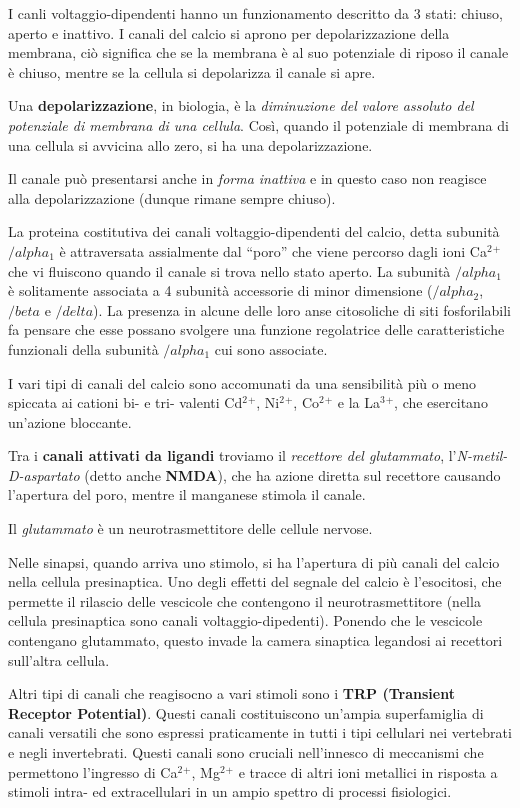 \documentclass[]{article}
\begin{document}
I canli voltaggio-dipendenti hanno un funzionamento descritto da 3
stati: chiuso, aperto e inattivo. I canali del calcio si aprono per
depolarizzazione della membrana, ciò significa che se la membrana è al
suo potenziale di riposo il canale è chiuso, mentre se la cellula si
depolarizza il canale si apre.

Una \textbf{depolarizzazione}, in biologia, è la \emph{diminuzione del
valore assoluto del potenziale di membrana di una cellula}. Così, quando
il potenziale di membrana di una cellula si avvicina allo zero, si ha
una depolarizzazione.

Il canale può presentarsi anche in \emph{forma inattiva} e in questo
caso non reagisce alla depolarizzazione (dunque rimane sempre chiuso).

La proteina costitutiva dei canali voltaggio-dipendenti del calcio,
detta subunità \(/alpha\)\(_1\) è attraversata assialmente dal ``poro''
che viene percorso dagli ioni Ca\(^2\)\(^+\) che vi fluiscono quando il
canale si trova nello stato aperto. La subunità \(/alpha\)\(_1\) è
solitamente associata a 4 subunità accessorie di minor dimensione
(\(/alpha\)\(_2\), \(/beta\) e \(/delta\)). La presenza in alcune delle
loro anse citosoliche di siti fosforilabili fa pensare che esse possano
svolgere una funzione regolatrice delle caratteristiche funzionali della
subunità \(/alpha\)\(_1\) cui sono associate.

I vari tipi di canali del calcio sono accomunati da una sensibilità più
o meno spiccata ai cationi bi- e tri- valenti Cd\(^2\)\(^+\),
Ni\(^2\)\(^+\), Co\(^2\)\(^+\) e la La\(^3\)\(^+\), che esercitano
un'azione bloccante.

Tra i \textbf{canali attivati da ligandi} troviamo il \emph{recettore
del glutammato}, l'\emph{N-metil-D-aspartato} (detto anche
\textbf{NMDA}), che ha azione diretta sul recettore causando l'apertura
del poro, mentre il manganese stimola il canale.

Il \emph{glutammato} è un neurotrasmettitore delle cellule nervose.

Nelle sinapsi, quando arriva uno stimolo, si ha l'apertura di più canali
del calcio nella cellula presinaptica. Uno degli effetti del segnale del
calcio è l'esocitosi, che permette il rilascio delle vescicole che
contengono il neurotrasmettitore (nella cellula presinaptica sono canali
voltaggio-dipedenti). Ponendo che le vescicole contengano glutammato,
questo invade la camera sinaptica legandosi ai recettori sull'altra
cellula.

Altri tipi di canali che reagisocno a vari stimoli sono i \textbf{TRP
(Transient Receptor Potential)}. Questi canali costituiscono un'ampia
superfamiglia di canali versatili che sono espressi praticamente in
tutti i tipi cellulari nei vertebrati e negli invertebrati. Questi
canali sono cruciali nell'innesco di meccanismi che permettono
l'ingresso di Ca\(^2\)\(^+\), Mg\(^2\)\(^+\) e tracce di altri ioni
metallici in risposta a stimoli intra- ed extracellulari in un ampio
spettro di processi fisiologici.
\end{document}
